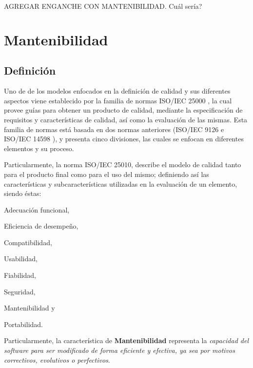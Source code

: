 AGREGAR ENGANCHE CON MANTENIBILIDAD.
Cuál sería?

\section{Mantenibilidad}

\subsection{Definición}

Uno de de los modelos enfocados en la definición de calidad y sus diferentes aspectos
viene establecido por la familia de normas ISO/IEC 25000 \cite{ref}, 
la cual provee guías para obtener un producto de calidad, mediante la especificación 
de requisitos y características de calidad, así como la evaluación de las mismas.
Esta familia de normas está basada en dos normas anteriores (ISO/IEC 9126 \cite{ref}
e ISO/IEC 14598 \cite{ref}), y presenta cinco divisiones, las cuales se enfocan en diferentes
elementos y su proceso.

Particularmente, la norma ISO/IEC 25010, describe el modelo de calidad tanto para el producto
final como para el uso del mismo; definiendo así las características y subcaracterísticas
utilizadas en la evaluación de un elemento, siendo éstas:
\begin{inparaenum}[(1)]
    \item Adecuación funcional,
    \item Eficiencia de desempeño,
    \item Compatibilidad,
    \item Usabilidad,
    \item Fiabilidad,
    \item Seguridad,
    \item Mantenibilidad y
    \item Portabilidad.
\end{inparaenum}
Particularmente, la característica de \textbf{Mantenibilidad} representa la \textit{capacidad del
software para ser modificado de forma eficiente y efectiva, ya sea por motivos correctivos,
evolutivos o perfectivos}.

